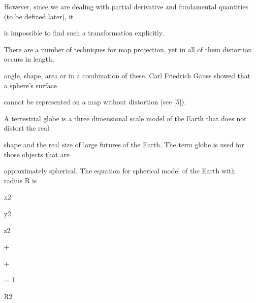 \documentclass[a4paper,portrait,12pt]{article}
\begin{document}
\begin{flushleft}
However, since we are dealing with partial derivative and fundamental quantities (to be defined later), it
\end{flushleft}


\begin{flushleft}
is impossible to find such a transformation explicitly.
\end{flushleft}


\begin{flushleft}
There are a number of techniques for map projection, yet in all of them distortion occurs in length,
\end{flushleft}


\begin{flushleft}
angle, shape, area or in a combination of these. Carl Friedrich Gauss showed that a sphere's surface
\end{flushleft}


\begin{flushleft}
cannot be represented on a map without distortion (see [5]).
\end{flushleft}


\begin{flushleft}
A terrestrial globe is a three dimensional scale model of the Earth that does not distort the real
\end{flushleft}


\begin{flushleft}
shape and the real size of large futures of the Earth. The term globe is used for those objects that are
\end{flushleft}


\begin{flushleft}
approximately spherical. The equation for spherical model of the Earth with radius R is
\end{flushleft}


\begin{flushleft}
x2
\end{flushleft}


\begin{flushleft}
y2
\end{flushleft}


\begin{flushleft}
z2
\end{flushleft}


+


+


= 1.


\begin{flushleft}
R2
\end{flushleft}
\end{document}
